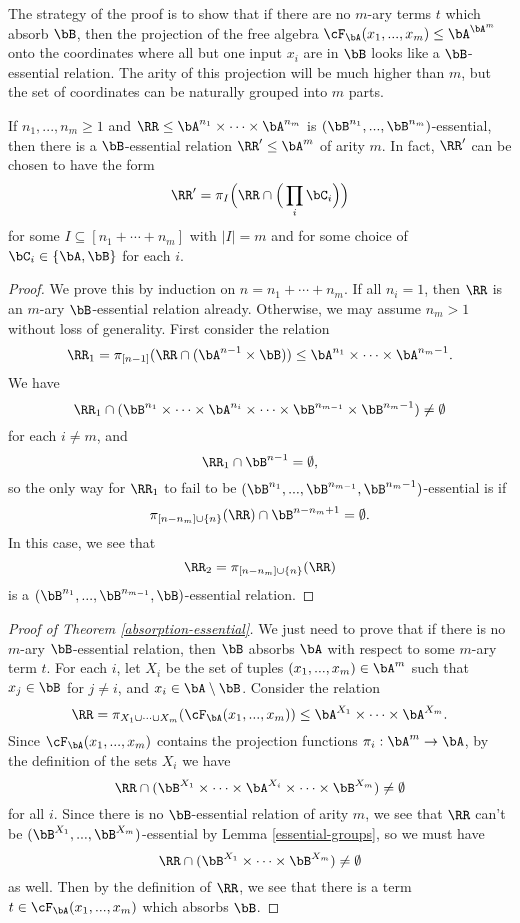 The strategy of the proof is to show that if there are no $m$-ary terms $t$ which absorb $\bB$, then the projection of the free algebra $\cF_{\bA}(x_1, ..., x_m) \le \bA^{\bA^m}$ onto the coordinates where all but one input $x_i$ are in $\bB$ looks like a $\bB$-essential relation. The arity of this projection will be much higher than $m$, but the set of coordinates can be naturally grouped into $m$ parts.

\begin{lem}\label{essential-groups} If $n_1, ..., n_m \ge 1$ and $\RR \le \bA^{n_1}\times \cdots \times \bA^{n_m}$ is $(\bB^{n_1}, ..., \bB^{n_m})$-essential, then there is a $\bB$-essential relation $\RR' \le \bA^m$ of arity $m$. In fact, $\RR'$ can be chosen to have the form
\[
\RR' = \pi_I\Big(\RR \cap \Big(\prod_i \bC_i\Big)\Big)
\]
for some $I \subseteq [n_1 + \cdots + n_m]$ with $|I| = m$ and for some choice of $\bC_i \in \{\bA, \bB\}$ for each $i$.
\end{lem}
\begin{proof} We prove this by induction on $n = n_1 + \cdots + n_m$. If all $n_i = 1$, then $\RR$ is an $m$-ary $\bB$-essential relation already. Otherwise, we may assume $n_m > 1$ without loss of generality. First consider the relation
\[
\RR_1 = \pi_{[n-1]}(\RR \cap (\bA^{n-1}\times \bB)) \le \bA^{n_1}\times \cdots \times \bA^{n_m-1}.
\]
We have
\[
\RR_1 \cap (\bB^{n_1}\times \cdots \times \bA^{n_i} \times \cdots \times \bB^{n_{m-1}} \times \bB^{n_m-1}) \ne \emptyset
\]
for each $i \ne m$, and
\[
\RR_1 \cap \bB^{n-1} = \emptyset,
\]
so the only way for $\RR_1$ to fail to be $(\bB^{n_1}, ..., \bB^{n_{m-1}}, \bB^{n_m-1})$-essential is if
\[
\pi_{[n-n_m]\cup\{n\}}(\RR) \cap \bB^{n-n_m+1} = \emptyset.
\]
In this case, we see that
\[
\RR_2 = \pi_{[n-n_m]\cup\{n\}}(\RR)
\]
is a $(\bB^{n_1}, ..., \bB^{n_{m-1}}, \bB)$-essential relation.
\end{proof}

\begin{proof}[Proof of Theorem \ref{absorption-essential}] We just need to prove that if there is no $m$-ary $\bB$-essential relation, then $\bB$ absorbs $\bA$ with respect to some $m$-ary term $t$. For each $i$, let $X_i$ be the set of tuples $(x_1, ..., x_m) \in \bA^m$ such that $x_j \in \bB$ for $j \ne i$, and $x_i \in \bA\setminus \bB$. Consider the relation
\[
\RR = \pi_{X_1 \cup \cdots \cup X_m} (\cF_{\bA}(x_1, ..., x_m)) \le \bA^{X_1} \times \cdots \times \bA^{X_m}.
\]
Since $\cF_{\bA}(x_1, ..., x_m)$ contains the projection functions $\pi_i : \bA^m \rightarrow \bA$, by the definition of the sets $X_i$ we have
\[
\RR \cap (\bB^{X_1} \times \cdots \times \bA^{X_i} \times \cdots \times \bB^{X_m}) \ne \emptyset
\]
for all $i$. Since there is no $\bB$-essential relation of arity $m$, we see that $\RR$ can't be $(\bB^{X_1}, ..., \bB^{X_m})$-essential by Lemma \ref{essential-groups}, so we must have
\[
\RR \cap (\bB^{X_1} \times \cdots \times \bB^{X_m}) \ne \emptyset
\]
as well. Then by the definition of $\RR$, we see that there is a term $t \in \cF_{\bA}(x_1, ..., x_m)$ which absorbs $\bB$.
\end{proof}

